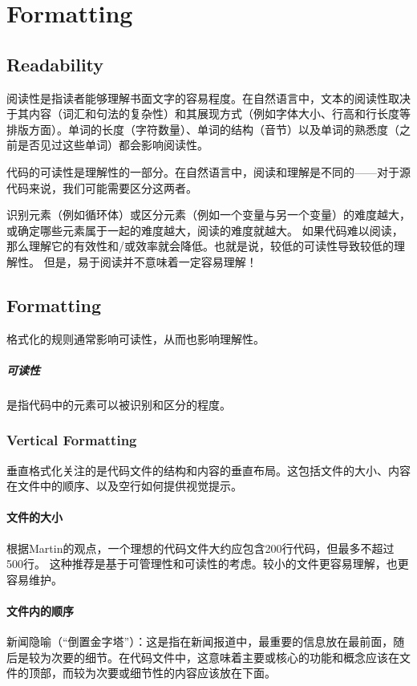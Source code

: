 \documentclass[]{ctexbook}
\begin{document}
\chapter{Formatting}

\section{Readability}
阅读性是指读者能够理解书面文字的容易程度。在自然语言中，文本的阅读性取决于其内容（词汇和句法的复杂性）和其展现方式（例如字体大小、行高和行长度等排版方面）。单词的长度（字符数量）、单词的结构（音节）以及单词的熟悉度（之前是否见过这些单词）都会影响阅读性。

代码的可读性是理解性的一部分。在自然语言中，阅读和理解是不同的——对于源代码来说，我们可能需要区分这两者。

识别元素（例如循环体）或区分元素（例如一个变量与另一个变量）的难度越大，或确定哪些元素属于一起的难度越大，阅读的难度就越大。
如果代码难以阅读，那么理解它的有效性和/或效率就会降低。也就是说，较低的可读性导致较低的理解性。
但是，易于阅读并不意味着一定容易理解！

\section{Formatting}
格式化的规则通常影响可读性，从而也影响理解性。

\paragraph{可读性}是指代码中的元素可以被识别和区分的程度。

\subsection{Vertical Formatting}

垂直格式化关注的是代码文件的结构和内容的垂直布局。这包括文件的大小、内容在文件中的顺序、以及空行如何提供视觉提示。

\subsubsection{文件的大小}
根据Martin的观点，一个理想的代码文件大约应包含200行代码，但最多不超过500行。
这种推荐是基于可管理性和可读性的考虑。较小的文件更容易理解，也更容易维护。
\subsubsection{文件内的顺序}
新闻隐喻（“倒置金字塔”）：这是指在新闻报道中，最重要的信息放在最前面，随后是较为次要的细节。在代码文件中，这意味着主要或核心的功能和概念应该在文件的顶部，而较为次要或细节性的内容应该放在下面。
\end{document}
